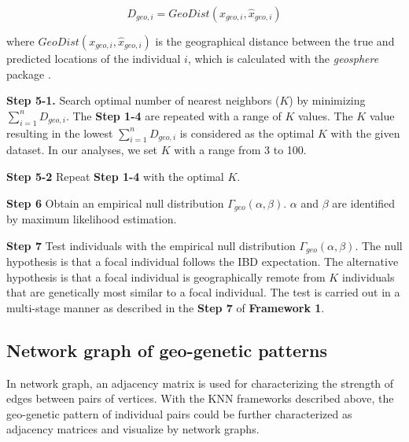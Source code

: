 \documentclass[11pt]{article}
\begin{document}
\begin{equation} \label{Dgeo_eq}
D_{geo, i}=GeoDist(x_{geo,i}, \hat{x}_{geo,i})
\end{equation}

where $GeoDist(x_{geo,i}, \hat{x}_{geo,i})$ is the geographical distance between the true and predicted locations of the individual $i$, which is calculated with the \textit{geosphere} package \citep{hijmansgeosphere}.

\textbf{Step 5-1.} Search optimal number of nearest neighbors ($K$) by minimizing $\sum_{i=1}^{n}D_{geo,i}$. 
The \textbf{Step 1-4} are repeated with a range of $K$ values.
The $K$ value resulting in the lowest $\sum_{i=1}^{n}D_{geo,i}$ is considered as the optimal $K$ with the given dataset.
In our analyses, we set $K$ with a range from 3 to 100.

\textbf{Step 5-2} Repeat \textbf{Step 1-4} with the optimal $K$.

\textbf{Step 6} Obtain an empirical null distribution $\Gamma_{geo}(\alpha,\beta)$. $\alpha$ and $\beta$ are identified by maximum likelihood estimation.

\textbf{Step 7} Test individuals with the empirical null distribution $\Gamma_{geo}(\alpha,\beta)$. 
The null hypothesis is that a focal individual follows the IBD expectation. The alternative hypothesis is that a focal individual is geographically remote from $K$ individuals that are genetically most similar to a focal individual.
The test is carried out in a multi-stage manner as described in the \textbf{Step 7} of \textbf{Framework 1}.

\subsection*{Network graph of geo-genetic patterns}

In network graph, an adjacency matrix is used for characterizing the strength of edges between pairs of vertices.
With the KNN frameworks described above, the geo-genetic pattern of individual pairs could be further characterized as adjacency matrices and visualize by network graphs.
\end{document}
